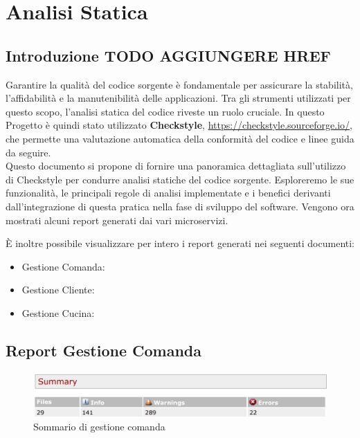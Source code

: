 \section{Analisi Statica}

\subsection{Introduzione TODO AGGIUNGERE HREF}

Garantire la qualità del codice sorgente è fondamentale per assicurare la stabilità, l'affidabilità e la manutenibilità delle applicazioni. Tra gli strumenti utilizzati per questo scopo, l'analisi statica del codice riveste un ruolo cruciale. In questo Progetto è quindi stato utilizzato \textbf{Checkstyle}, \href{https://checkstyle.sourceforge.io/}{https://checkstyle.sourceforge.io/}, che permette una valutazione automatica della conformità del codice e linee guida da seguire.
\\
Questo documento si propone di fornire una panoramica dettagliata sull'utilizzo di Checkstyle per condurre analisi statiche del codice sorgente. Esploreremo le sue funzionalità, le principali regole di analisi implementate e i benefici derivanti dall'integrazione di questa pratica nella fase di sviluppo del software. Vengono ora mostrati alcuni report generati dai vari microservizi.

È inoltre possibile visualizzare per intero i report generati nei seguenti documenti:


\begin{itemize}
	\item Gestione Comanda:
	\item Gestione Cliente: 
	\item Gestione Cucina: 
\end{itemize}


\newpage

\subsection{Report Gestione Comanda}

\begin{figure}[htbp]
	\centering
	\includegraphics[scale=0.6]{iterazione1/images/Cs_Summary_Gestione_Comanda.jpg}
	\caption{Sommario di gestione comanda\label{fig:Cs_Summary_Gestione_Comanda}}
\end{figure}

